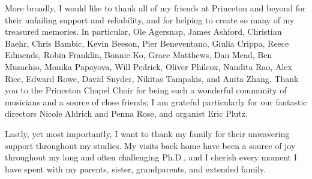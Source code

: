 More broadly, I would like to thank all of my friends at Princeton and beyond
for their unfailing support and reliability, and for
helping to create so many of my treasured memories. In particular,
Ole Agersnap, James Ashford, Christian Baehr,
Chris Bambic, Kevin Beeson, Pier Beneventano, Giulia Crippa, Reece
Edmends, Robin Franklin, Bonnie Ko,
Grace Matthews, Dan Mead, Ben Musachio, Monika
Papayova, Will Pedrick, Oliver Philcox,
Nandita Rao, Alex Rice, Edward Rowe, David Snyder,
Nikitas Tampakis, and Anita Zhang.
Thank you to the Princeton Chapel Choir for being such a wonderful
community of musicians and a source of close friends; I am
grateful particularly for our fantastic directors Nicole Aldrich
and Penna Rose, and organist Eric Plutz.

Lastly, yet most importantly, I want to thank my family for their unwavering
support throughout my studies. My visits back home have been a source of joy
throughout my long and often challenging Ph.D., and I cherish every moment I
have spent with my parents, sister, grandparents, and extended family.
